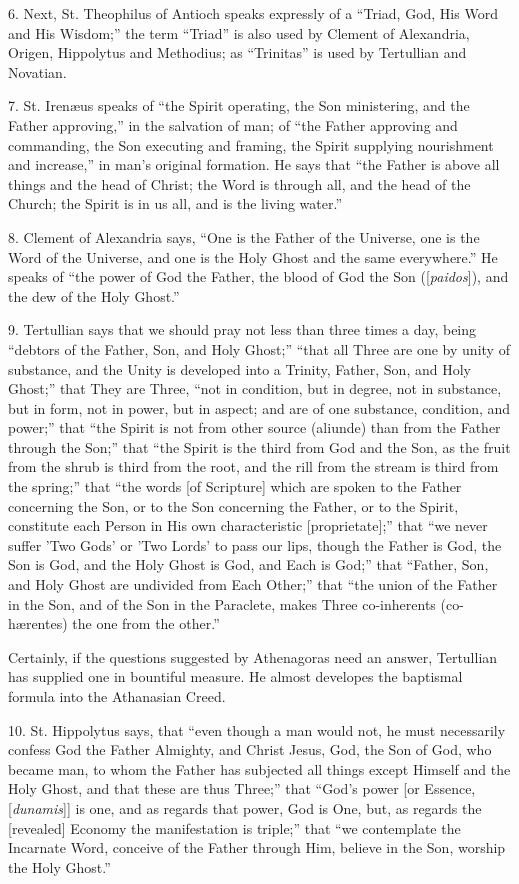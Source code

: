 6. Next, St. Theophilus of Antioch speaks expressly of a
``Triad, God, His Word and His Wisdom;'' the term
``Triad'' is also used by Clement of Alexandria, Origen,
Hippolytus and Methodius; as ``Trinitas'' is used by
Tertullian and Novatian.

7. St. Irenæus speaks of ``the Spirit operating, the Son
ministering, and the Father approving,'' in the salvation of man;
of ``the Father approving and commanding, the Son executing
and framing, the Spirit supplying nourishment and increase,'' in
man's original formation. He says that ``the Father is above all
things and the head of Christ; the Word is through all, and the head
of the Church; the Spirit is in us all, and is the living water.''

8. Clement of Alexandria says, ``One is the Father of the
Universe, one is the Word of the Universe, and one is the Holy Ghost
and the same everywhere.'' He speaks of ``the power of God the
Father, the blood of God the Son ([\emph{paidos}]), and the dew of the
Holy Ghost.''

9. Tertullian says that we should pray not less than three times a
day, being ``debtors of the Father, Son, and Holy Ghost;''
``that all Three are one by unity of substance, and the Unity is
developed into a Trinity, Father, Son, and Holy Ghost;'' that They
are Three, ``not in condition, but in degree, not in substance,
but in form, not in power, but in aspect; and are of one substance,
condition, and power;'' that ``the Spirit is not from other
source (aliunde) than from the Father through the Son;'' that
``the Spirit is the third from God and the Son, as the fruit from
the shrub is third from the root, and the rill from the stream is
third from the spring;'' that ``the words [of Scripture] which
are spoken to the Father concerning the Son, or to the Son concerning
the Father, or to the Spirit, constitute each Person in His own
characteristic [proprietate];'' that ``we never suffer 'Two
Gods' or 'Two Lords' to pass our lips, though the Father is God, the
Son is God, and the Holy Ghost is God, and Each is God;'' that
``Father, Son, and Holy Ghost are undivided from Each
Other;'' that ``the union of the Father in the Son, and of the
Son in the Paraclete, makes Three co-inherents (co-hærentes) the one
from the other.''

Certainly, if the questions suggested by Athenagoras need an
answer, Tertullian has supplied one in bountiful measure. He almost
developes the baptismal formula into the Athanasian Creed.

10. St. Hippolytus says, that ``even though a man would not, he
must necessarily confess God the Father Almighty, and Christ Jesus,
God, the Son of God, who became man, to whom the Father has subjected
all things except Himself and the Holy Ghost, and that these are thus
Three;'' that ``God's power [or Essence, [\emph{dunamis}]] is
one, and as regards that power, God is One, but, as regards the
[revealed] Economy the manifestation is triple;'' that ``we
contemplate the Incarnate Word, conceive of the Father through Him,
believe in the Son, worship the Holy Ghost.''

